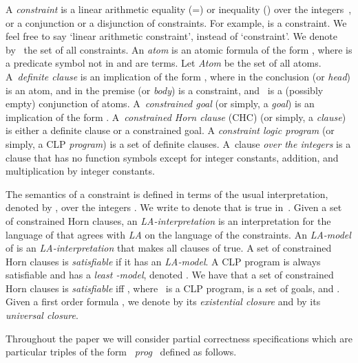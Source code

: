 \documentclass[english]{tlp}
\begin{document}
A \textit{constraint}
is a linear arithmetic equality (=) or inequality ()
over the integers~, or a conjunction
or a disjunction of constraints. For example, 
 is a constraint.
We feel free to say
`linear arithmetic constraint', instead of `constraint'.
We denote by~ the set of all constraints.
An {\it atom} is an atomic formula of the form ,
where  is a predicate symbol not in  and 
 are terms.
Let {\it Atom} be the set of all atoms.
A~{\it definite clause} is an implication of the form  
, where in the conclusion (or {\it head\/})  is an atom, 
and in the
premise (or {\it body\/})  is a constraint, and~ is a (possibly empty)
conjunction of atoms.
A~{\it constrained goal} (or simply, a {\it goal}\/) is  an implication of the form  
.
A~{\it constrained Horn clause} (CHC) (or simply, a {\it clause}) 
is either a definite 
clause or a constrained goal. 
A {\it constraint logic program} (or simply, a CLP {\it program})  
is a set of definite clauses.
A~clause {\it over the integers} is a clause that has no function 
symbols except for integer constants, addition, and
multiplication by integer constants.

The semantics of a constraint  
is defined in terms of the usual interpretation, denoted by ,
over the integers . We write  to denote
that  is true in~.
Given a set  of constrained Horn clauses, an
{\it LA-interpretation} is an interpretation for the language of
 that agrees with {\it LA}
on the language of the constraints.
An {\it LA-model} of  
is an {\it LA-interpretation} that makes all clauses of  true.
A set of constrained Horn clauses is {\it satisfiable} if it has an {\it LA-model}.
A CLP program  is always satisfiable and has a 
{\it least -model}, denoted . 
We have that a set  of constrained Horn clauses is {\it satisfiable} iff 
, where~ is a CLP program,  is a set  of goals, and
.
Given a first order formula , we denote by 
its {\it existential closure} and by  its 
{\it universal closure}.


Throughout the paper we will consider partial correctness 
specifications which are particular triples of the form
\mbox{ {\textit{prog}} } defined as follows.
\vspace{-1mm}
\end{document}
